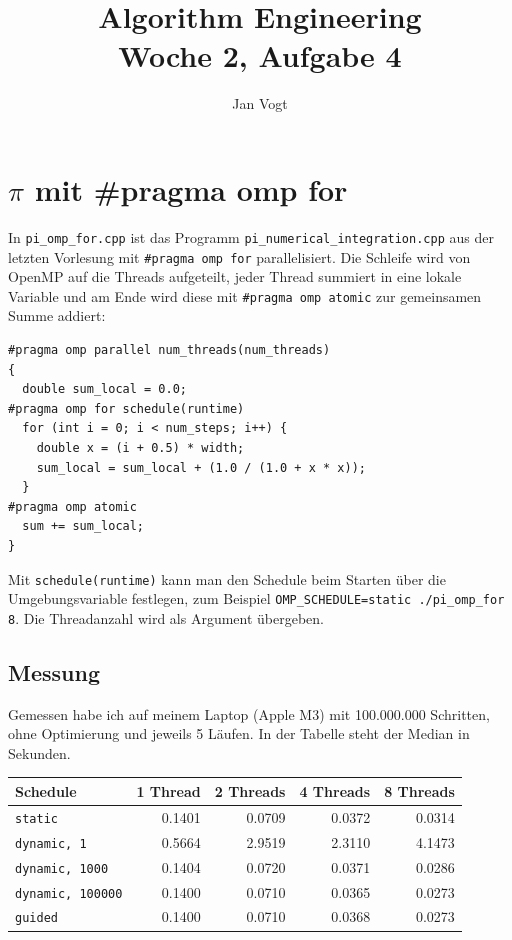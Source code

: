 \documentclass[11pt]{article}
\title{Algorithm Engineering\\Woche 2, Aufgabe 4}
\author{Jan Vogt}
\date{}
\begin{document}
\maketitle

\section*{$\pi$ mit \#pragma omp for}

In \texttt{pi\_omp\_for.cpp} ist das Programm \texttt{pi\_numerical\_integration.cpp} aus der
letzten Vorlesung mit \texttt{\#pragma omp for} parallelisiert. Die Schleife wird von OpenMP auf
die Threads aufgeteilt, jeder Thread summiert in eine lokale Variable und am Ende wird diese mit
\texttt{\#pragma omp atomic} zur gemeinsamen Summe addiert:
\begin{verbatim}
#pragma omp parallel num_threads(num_threads)
{
  double sum_local = 0.0;
#pragma omp for schedule(runtime)
  for (int i = 0; i < num_steps; i++) {
    double x = (i + 0.5) * width;
    sum_local = sum_local + (1.0 / (1.0 + x * x));
  }
#pragma omp atomic
  sum += sum_local;
}
\end{verbatim}
Mit \texttt{schedule(runtime)} kann man den Schedule beim Starten über die Umgebungsvariable
festlegen, zum Beispiel \verb|OMP_SCHEDULE=static ./pi_omp_for 8|. Die Threadanzahl wird als
Argument übergeben.

\subsection*{Messung}

Gemessen habe ich auf meinem Laptop (Apple M3) mit 100.000.000 Schritten, ohne Optimierung und
jeweils 5 Läufen. In der Tabelle steht der Median in Sekunden.

\begin{center}
\begin{tabular}{lrrrr}
Schedule & 1 Thread & 2 Threads & 4 Threads & 8 Threads \\
\hline
\texttt{static} & 0.1401 & 0.0709 & 0.0372 & 0.0314 \\
\texttt{dynamic, 1} & 0.5664 & 2.9519 & 2.3110 & 4.1473 \\
\texttt{dynamic, 1000} & 0.1404 & 0.0720 & 0.0371 & 0.0286 \\
\texttt{dynamic, 100000} & 0.1400 & 0.0710 & 0.0365 & 0.0273 \\
\texttt{guided} & 0.1400 & 0.0710 & 0.0368 & 0.0273 \\
\end{tabular}
\end{center}
\end{document}
